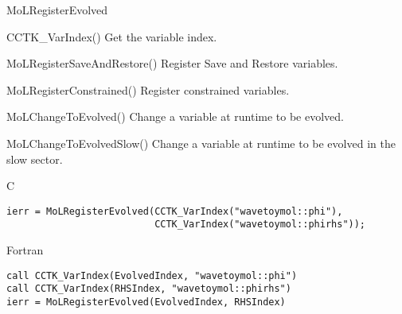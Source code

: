 \begin{FunctionDescription}{MoLRegisterEvolved}
  \begin{SeeAlsoSection}
    \begin{SeeAlso}{CCTK\_VarIndex()}
      Get the variable index.
    \end{SeeAlso}
    \begin{SeeAlso}{MoLRegisterSaveAndRestore()}
      Register Save and Restore variables.
    \end{SeeAlso}
    \begin{SeeAlso}{MoLRegisterConstrained()}
      Register constrained variables.
    \end{SeeAlso}
    \begin{SeeAlso}{MoLChangeToEvolved()}
      Change a variable at runtime to be evolved.
    \end{SeeAlso}
    \begin{SeeAlso}{MoLChangeToEvolvedSlow()}
      Change a variable at runtime to be evolved in the slow sector.
    \end{SeeAlso}
  \end{SeeAlsoSection}

  \begin{ExampleSection}
    \begin{Example}{C}
\begin{verbatim}
ierr = MoLRegisterEvolved(CCTK_VarIndex("wavetoymol::phi"),
                          CCTK_VarIndex("wavetoymol::phirhs"));
\end{verbatim}
    \end{Example}
    \begin{Example}{Fortran}
\begin{verbatim}
call CCTK_VarIndex(EvolvedIndex, "wavetoymol::phi")
call CCTK_VarIndex(RHSIndex, "wavetoymol::phirhs")
ierr = MoLRegisterEvolved(EvolvedIndex, RHSIndex)
\end{verbatim}
    \end{Example}
  \end{ExampleSection}

\end{FunctionDescription}



